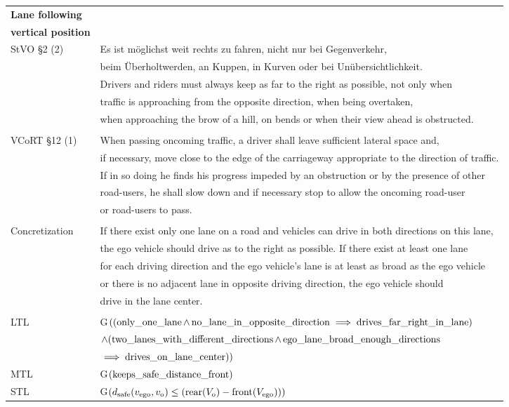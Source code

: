 \begin{table}[H]
	\centering
	\begin{tabular}[t]{ll}
		\toprule
		\textbf{Lane following} & \\
		\textbf{vertical position} & \\
		\midrule
		StVO \S 2 (2)& Es ist möglichst weit rechts zu fahren, nicht nur bei Gegenverkehr, \\
		& beim Überholtwerden, an Kuppen, in Kurven oder bei Unübersichtlichkeit. \\ 
		& Drivers and riders must always keep as far to the right as possible, not only when \\
		& traffic is approaching from the opposite direction, when being overtaken, \\
		& when approaching the brow of a hill, on bends or when their view ahead is obstructed.\\
		&\\
		VCoRT \S 12 (1) & When passing oncoming traffic, a driver shall leave sufficient lateral space and, \\
		& if necessary, move close to the edge of the carriageway appropriate to the direction of traffic. \\
		& If in so doing he finds his progress impeded by an obstruction or by the presence of other \\ 
		& road-users, he shall slow down and if necessary stop to allow the oncoming road-user \\
		& or road-users to pass. \\
		&\\
		Concretization &  If there exist only one lane on a road and vehicles can drive in both directions on this lane, \\
		& the ego vehicle should drive as to the right as possible. If there exist at least one lane \\
		& for each driving direction and the ego vehicle's lane is at least as broad as the ego vehicle \\
		& or there is no adjacent lane in opposite driving direction, the ego vehicle should \\
		& drive in the lane center.\\
		&\\
		LTL & G$((\operatorname*{only\_one\_lane} \land \operatorname*{no\_lane\_in\_opposite\_direction} \implies \operatorname*{drives\_far\_right\_in\_lane})   $\\
		& $ \land (\operatorname*{two\_lanes\_with\_different\_directions} \land \operatorname*{ego\_lane\_broad\_enough\_directions}$ \\
		& $\implies \operatorname*{drives\_on\_lane\_center}))$\\
		MTL & G$(\operatorname*{keeps\_safe\_distance\_front})$\\
		STL & G$(d_\text{safe}(v_\text{ego}, v_\text{o}) \leq (\operatorname*{rear}(V_\text{o}) - \operatorname*{front}(V_\text{ego})))$\\
		\bottomrule
	\end{tabular}
\end{table}


